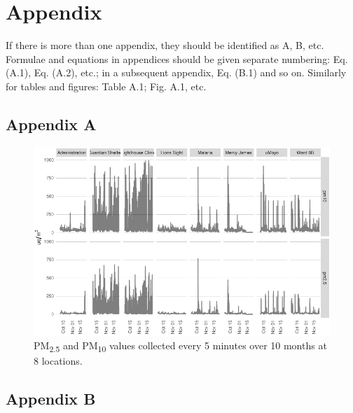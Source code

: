 \documentclass[
  authoryear,
  review,
  3p]{elsarticle}
\begin{document}
\hypertarget{appendix}{%
\section*{Appendix}\label{appendix}}

If there is more than one appendix, they should be identified as A, B,
etc. Formulae and equations in appendices should be given separate
numbering: Eq. (A.1), Eq. (A.2), etc.; in a subsequent appendix, Eq.
(B.1) and so on. Similarly for tables and figures: Table A.1; Fig. A.1,
etc.

\hypertarget{appendix-a}{%
\subsection*{Appendix A}\label{appendix-a}}

\begin{figure}

{\centering \includegraphics{manuscript-qech-air-quality-tilley_files/figure-pdf/fig-five-minute-intervals-1.pdf}

}

\caption{\label{fig-five-minute-intervals}PM\textsubscript{2.5} and
PM\textsubscript{10} values collected every 5 minutes over 10 months at
8 locations.}

\end{figure}

\hypertarget{appendix-b}{%
\subsection*{Appendix B}\label{appendix-b}}
\end{document}
